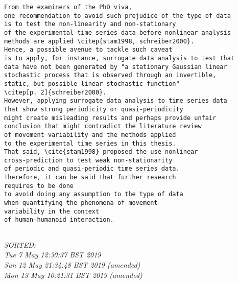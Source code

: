 \documentclass[12pt]{article}
\begin{document}
\begin{enumerate}
\begin{verbatim}
From the examiners of the PhD viva, 
one recommendation to avoid such prejudice of the type of data  
is to test the non-linearity and non-stationary 
of the experimental time series data before nonlinear analysis 
methods are applied \citep{stam1998, schreiber2000}.
Hence, a possible avenue to tackle such caveat 
is to apply, for instance, surrogate data analysis to test that 
data have not been generated by "a stationary Gaussian linear
stochastic process that is observed through an invertible,
static, but possible linear stochastic function" 
\citep[p. 2]{schreiber2000}.
However, applying surrogate data analysis to time series data 
that show strong periodicity or quasi-periodicity 
might create misleading results and perhaps provide unfair 
conclusion that might contradict the literature review 
of movement variability and the methods applied 
to the experimental time series in this thesis.
That said, \cite{stam1998} proposed the use nonlinear 
cross-prediction to test weak non-stationarity 
of periodic and quasi-periodic time series data.
Therefore, it can be said that further research
requires to be done 
to avoid doing any assumption to the type of data
when quantifying the phenomena of movement 
variability in the context
of human-humanoid interaction.


	\end{verbatim}
	\textit{
	SORTED: \\ 
	Tue  7 May 12:30:37 BST 2019 \\
	Sun 12 May 21:34:48 BST 2019 (amended) \\
	Mon 13 May 10:21:31 BST 2019 (amended)
	}
	\\






\end{enumerate}
\end{document}
